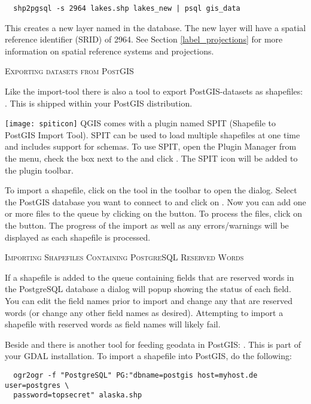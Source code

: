 \begin{verbatim} 
  shp2pgsql -s 2964 lakes.shp lakes_new | psql gis_data
\end{verbatim}

This creates a new layer named  in the
 database. The
new layer will have a spatial reference identifier (SRID) of 2964. See Section 
\ref{label_projections} for more information on spatial reference systems and
projections.
\begin{Tip}
\caption{\textsc{Exporting datasets from PostGIS}}
Like the import-tool  there is also a tool to export
PostGIS-datasets as shapefiles: . This is shipped within your
PostGIS distribution.
\end{Tip}

\texttt{[image: spiticon]} QGIS comes with a
plugin named 
SPIT (Shapefile to PostGIS Import Tool).
SPIT can be used to load multiple shapefiles at one time and includes support
for schemas. To use SPIT, open the Plugin Manager from the 
menu, check the box next to the  and click . The SPIT
icon will be added to the plugin toolbar. 

To import a shapefile, click on the  tool in the 
toolbar to open the 
 dialog. Select the PostGIS database 
you want to connect to and click on . Now you can add one or more 
files to the queue by clicking on the  button. To process the files, 
click on the  button. The progress of the import as well as any 
errors/warnings will be displayed as each shapefile is processed.

\begin{Tip}\caption{\textsc{Importing Shapefiles Containing
PostgreSQL Reserved Words}}
If a shapefile is added to the queue containing fields that are
reserved words in the PostgreSQL database a dialog will popup showing the
status
of each field. You can edit the field names
prior to import and change any that are reserved words (or change any other
field names as desired). Attempting to
import a shapefile with reserved words as field names will likely fail.
\end{Tip} 

Beside  and  there is another tool for feeding
geodata in PostGIS: . This is part of your GDAL installation.
To import a shapefile into PostGIS, do the following:
\begin{verbatim}
  ogr2ogr -f "PostgreSQL" PG:"dbname=postgis host=myhost.de user=postgres \
  password=topsecret" alaska.shp
\end{verbatim}


